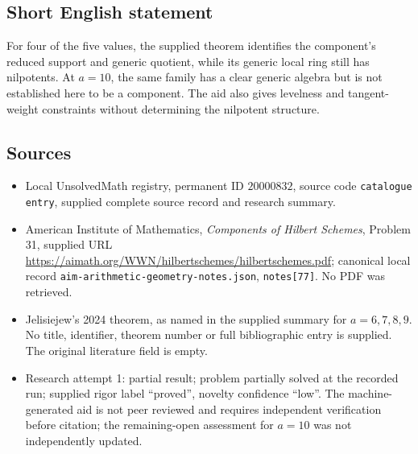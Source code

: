 \documentclass[11pt]{article}
\begin{document}
\subsection{Short English statement}
For four of the five values, the supplied theorem identifies the component's reduced support and generic quotient, while its generic local ring still has nilpotents. At $a=10$, the same family has a clear generic algebra but is not established here to be a component. The aid also gives levelness and tangent-weight constraints without determining the nilpotent structure.
\subsection{Sources}
\begin{itemize}
\item Local UnsolvedMath registry, permanent ID $20000832$, source code \texttt{catalogue entry}, supplied complete source record and research summary.
\item American Institute of Mathematics, \emph{Components of Hilbert Schemes}, Problem 31, supplied URL \url{https://aimath.org/WWN/hilbertschemes/hilbertschemes.pdf}; canonical local record \texttt{aim-arithmetic-geometry-notes.json}, \texttt{notes[77]}. No PDF was retrieved.
\item Jelisiejew's 2024 theorem, as named in the supplied summary for $a=6,7,8,9$. No title, identifier, theorem number or full bibliographic entry is supplied. The original literature field is empty.
\item Research attempt 1: partial result; problem partially solved at the recorded run; supplied rigor label ``proved'', novelty confidence ``low''. The machine-generated aid is not peer reviewed and requires independent verification before citation; the remaining-open assessment for $a=10$ was not independently updated.
\end{itemize}
\end{document}
